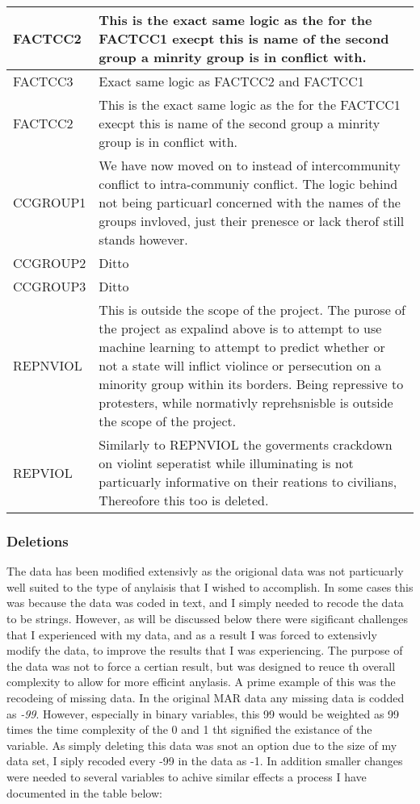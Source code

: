 \documentclass[12pt]{article}
\begin{document}
\begin{center}
\begin{longtable}{p{3cm}p{10cm}}
\hline 
FACTCC2 & This is the exact same logic as the for the FACTCC1 execpt this is name of the second group a minrity group is in conflict with. \\
\hline
FACTCC3 & Exact same logic as FACTCC2 and FACTCC1\\
\hline
FACTCC2 & This is the exact same logic as the for the FACTCC1 execpt this is name of the second group a minrity group is in conflict with. \\
\hline
CCGROUP1 & We have now moved on to instead of intercommunity conflict to intra-communiy conflict. The logic behind not being particuarl concerned with the names of the groups invloved, just their prenesce or lack therof still stands however.\\
\hline
CCGROUP2 & Ditto \\
\hline
CCGROUP3 & Ditto \\
\hline
REPNVIOL & This is outside the scope of the project. The purose of the project as expalind above is to attempt to use machine learning to attempt to predict whether or not a state will inflict violince or persecution on a minority group within its borders. Being repressive to protesters, while normativly reprehsnisble is outside the scope of the project.\\
\hline
REPVIOL & Similarly to REPNVIOL the goverments crackdown on violint seperatist while illuminating is not particuarly informative on their reations to civilians, Thereofore this too is deleted. 
\end{longtable}
\end{center}

\subsubsection{Deletions}
The data has been modified extensivly as the origional data was not particuarly well suited to the type of anylaisis that I wished to accomplish. In some cases this was because the data was coded in text, and I simply needed to recode the data to be strings. However, as will be discussed below there were sigificant challenges that I experienced with my data, and as a result I was forced to extensivly modify the data, to improve the results that I was experiencing. The purpose of the data was not to force a certian result, but was designed to reuce th overall complexity to allow for more efficint anylasis. A prime example of this was the recodeing of missing data. In the original MAR data any missing data is codded as {\em -99}. However, especially in binary variables, this 99 would be weighted as 99 times the time complexity of the 0 and 1 tht signified the existance of the variable. As simply deleting this data was snot an option due to the size of my data set, I siply recoded every -99 in the data as -1. In addition smaller changes were needed to several variables to achive similar effects a process I have documented in the table below: 
\end{document}
